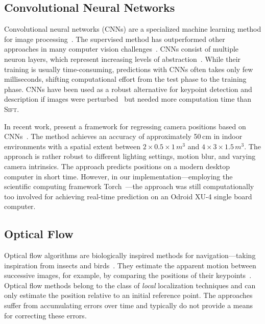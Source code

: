 \documentclass[11pt]{report}
\begin{document}
\subsection{Convolutional Neural Networks}

Convolutional neural networks (CNNs) are a specialized machine
learning method for image processing~\cite{lecun1998gradient}. The
supervised method has outperformed other approaches in many computer
vision challenges~\cite{dosovitskiy2014discriminative}. CNNs consist
of multiple neuron layers, which represent increasing levels of
abstraction~\cite{lecun1998gradient}. While their training is usually
time-consuming, predictions with CNNs often takes only few
milliseconds, shifting computational effort from the test phase to the
training phase. CNNs have been used as a robust alternative for
keypoint detection and description if images were
perturbed~\cite{dosovitskiy2014discriminative} but needed more
computation time than \textsc{Sift}.

In recent work, \citeauthor{kendall2015posenet} present a framework
for regressing camera positions based on
CNNs~\cite{kendall2015posenet}. The method achieves an accuracy of
approximately 50\,cm in indoor environments with a spatial extent
between $2 \times 0.5 \times 1\,m^3$ and $4 \times 3 \times
1.5\,m^3$. The approach is rather robust to different lighting
settings, motion blur, and varying camera intrinsics. The approach
predicts positions on a modern desktop computer in short
time. However, in our implementation---employing the scientific
computing framework Torch~\cite{collobert2011torch7}---the approach
was still computationally too involved for achieving real-time
prediction on an Odroid XU-4 single board computer.

\subsection{Optical Flow}
\label{sec:opticalflow}

Optical flow algorithms are biologically inspired methods for
navigation---taking inspiration from insects and
birds~\cite{ruffier2003bio}. They estimate the apparent motion between
successive images, for example, by comparing the positions of their
keypoints~\cite{chao2013survey}.
Optical flow methods belong to the class of \emph{local} localization
techniques and can only estimate the position relative to an initial
reference point. The approaches suffer from accumulating errors over
time and typically do not provide a means for correcting these errors.
\end{document}
